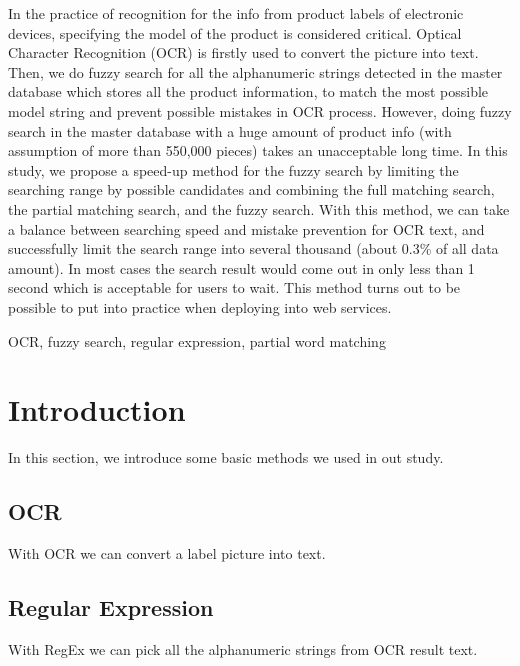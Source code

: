 \documentclass[technicalreport]{ieicej}
\begin{document}
\begin{eabstract}
In the practice of recognition for the info from product labels of electronic devices, specifying the model of the product is considered critical. Optical Character Recognition (OCR) is firstly used to convert the picture into text. Then, we do fuzzy search for all the alphanumeric strings detected in the master database which stores all the product information, to match the most possible model string and prevent possible mistakes in OCR process. 
However, doing fuzzy search in the master database with a huge amount of product info (with assumption of more than 550,000 pieces) takes an unacceptable long time.
In this study, we propose a speed-up method for the fuzzy search by limiting the searching range by possible candidates and combining the full matching search, the partial matching search, and the fuzzy search. 
With this method, we can take a balance between searching speed and mistake prevention for OCR text, and successfully limit the search range into several thousand (about 0.3\% of all data amount). In most cases the search result would come out in only less than 1 second which is acceptable for users to wait. This method turns out to be possible to put into practice when deploying into web services.  
\end{eabstract}
\begin{ekeyword}
OCR, fuzzy search, regular expression, partial word matching
\end{ekeyword}
\maketitle

\section{Introduction}
    In this section, we introduce some basic methods we used in out study.
    \subsection{OCR}
        With OCR we can convert a label picture into text.
    \subsection{Regular Expression}
        With RegEx we can pick all the alphanumeric strings from OCR result text.
\end{document}
